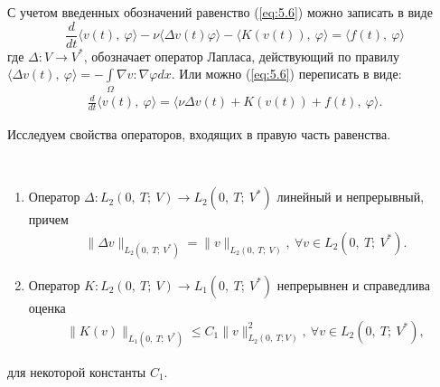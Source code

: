 С учетом введенных обозначений равенство (\ref{eq:5.6}) можно записать в виде
$$\frac{d}{dt} \langle v(t), \ \varphi \rangle - \nu\langle \Delta v(t) \varphi \rangle -
\langle K(v(t)), \ \varphi \rangle = \langle f(t), \ \varphi \rangle $$
где $\Delta: V \rightarrow V^\ast$, обозначает оператор Лапласа, действующий по правилу
$\langle \Delta v(t), \ \varphi \rangle=-\int\limits_\Omega \nabla v:\nabla\varphi dx.$
Или можно (\ref{eq:5.6}) переписать в виде:
\begin{equation}\label{eq:5.8}
    \begin{gathered}
        \frac{d}{dt} \langle v(t), \ \varphi \rangle = \langle \nu\Delta v(t)+K(v(t))+f(t), \ \varphi \rangle.
    \end{gathered}
\end{equation}

Исследуем свойства операторов, входящих в правую часть равенства.
\begin{lemma} ~\\
    \begin{enumerate}
        \item Оператор \linebreak $\Delta: L_2(0, \ T; \ V) \rightarrow L_2(0, \ T; \ V^\ast)$ линейный и непрерывный, причем
        \begin{equation}\label{eq:5.9}
            \begin{gathered}
                \parallel \Delta v \parallel_{L_2(0, \ T; \ V^\ast)} = \parallel v \parallel_{L_2(0, \ T; \ V)}, \ \forall v \in L_2(0, \ T; \ V^\ast).
            \end{gathered}
        \end{equation}
        \item Оператор $K: L_2(0, \ T; \ V) \rightarrow L_1(0, \ T; \ V^\ast)$ непрерывнен и справедлива оценка
        \begin{equation}\label{eq:5.10}
            \begin{gathered}
                \parallel K(v) \parallel_{L_1(0, \ T; \ V^\ast)} \leqslant C_1\parallel v \parallel^2_{L_2(0, \ T;V)}, \ \forall v \in L_2(0, \ T; \ V^\ast),
            \end{gathered}
        \end{equation}
    \end{enumerate}
    для некоторой константы $C_1$.
\end{lemma}

